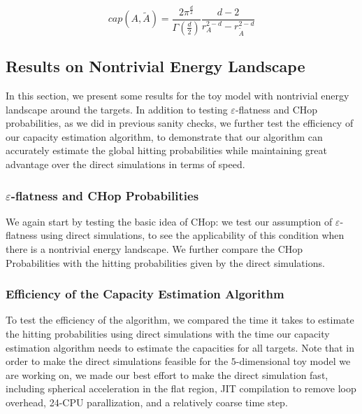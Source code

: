 \documentclass[english, aip, jcp, priprint, graphicx]{revtex4-1}
\theoremstyle{plain}
\theoremstyle{definition}
\theoremstyle{plain}
\begin{document}
\begin{equation}
cap(A, \tilde{A}) = \frac{2\pi^{\frac{d}{2}}}{\Gamma(\frac{d}{2})}\frac{d - 2}{r_A^{2 - d} - r_{\tilde{A}}^{2 - d}}
\end{equation}



\subsection{Results on Nontrivial Energy Landscape}

In this section, we present some results for the toy model with nontrivial energy landscape around the targets. In addition to testing $\varepsilon$-flatness and CHop probabilities, as we did in previous sanity checks, we further test the efficiency of our capacity estimation algorithm, to demonstrate that our algorithm can accurately estimate the global hitting probabilities while maintaining great advantage over the direct simulations in terms of speed.



\subsubsection{$\varepsilon$-flatness and CHop Probabilities}

We again start by testing the basic idea of CHop: we test our assumption of $\varepsilon$-flatness using direct simulations, to see the applicability of this condition when there is a nontrivial energy landscape. We further compare the CHop Probabilities with the hitting probabilities given by the direct simulations.



\subsubsection{Efficiency of the Capacity Estimation Algorithm}

To test the efficiency of the algorithm, we compared the time it takes to estimate the hitting probabilities using direct simulations with the time our capacity estimation algorithm needs to estimate the capacities for all targets. Note that in order to make the direct simulations feasible for the $5$-dimensional toy model we are working on, we made our best effort to make the direct simulation fast, including spherical acceleration in the flat region, JIT compilation to remove loop overhead, 24-CPU parallization, and a relatively coarse time step.
\end{document}
